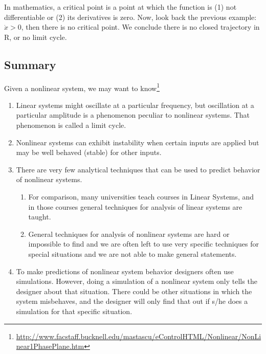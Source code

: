 In mathematics, a critical point is a point at which the function is
(1) not differentiable or (2) its derivatives is zero. Now, look back
the previous example: $\dot{x} > 0$, then there is no critical
point. We conclude there is no closed trajectory in R, or no limit
cycle. 

\subsection{Summary}
\label{sec:summary-3}


Given a nonlinear system, we may want to
know\footnote{\url{http://www.facstaff.bucknell.edu/mastascu/eControlHTML/Nonlinear/NonLinear1PhasePlane.htm}}

\begin{enumerate}

\item Linear systems might oscillate at a particular frequency, but
  oscillation at a particular amplitude is a phenomenon peculiar to
  nonlinear systems.  That phenomenon is called a limit cycle.

\item Nonlinear systems can exhibit instability when certain inputs
  are applied but may be well behaved (stable) for other inputs.

\item There are very few analytical techniques that can be used to
  predict behavior of nonlinear systems.

  \begin{enumerate}
  \item For comparison, many universities teach courses in Linear
    Systems, and in those courses general techniques for analysis of
    linear systems are taught.
  \item General techniques for analysis of nonlinear systems are hard
    or impossible to find and we are often left to use very specific
    techniques for special situations and we are not able to make
    general statements.

  \end{enumerate}

\item To make predictions of nonlinear system behavior designers often
  use simulations.  However, doing a simulation of a nonlinear system
  only tells the designer about that situation.  There could be other
  situations in which the system misbehaves, and the designer will
  only find that out if s/he does a simulation for that specific
  situation.

\end{enumerate}


